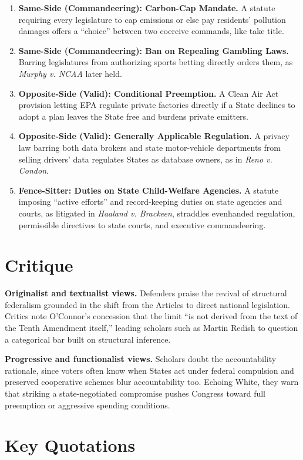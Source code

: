\documentclass[12pt]{article}
\begin{document}
\begin{enumerate}
\item \textbf{Same-Side (Commandeering): Carbon-Cap Mandate.} A statute requiring every legislature to cap emissions or else pay residents' pollution damages offers a ``choice'' between two coercive commands, like take title.
\item \textbf{Same-Side (Commandeering): Ban on Repealing Gambling Laws.} Barring legislatures from authorizing sports betting directly orders them, as \textit{Murphy v. NCAA} later held.
\item \textbf{Opposite-Side (Valid): Conditional Preemption.} A Clean Air Act provision letting EPA regulate private factories directly if a State declines to adopt a plan leaves the State free and burdens private emitters.
\item \textbf{Opposite-Side (Valid): Generally Applicable Regulation.} A privacy law barring both data brokers and state motor-vehicle departments from selling drivers' data regulates States as database owners, as in \textit{Reno v. Condon}.
\item \textbf{Fence-Sitter: Duties on State Child-Welfare Agencies.} A statute imposing ``active efforts'' and record-keeping duties on state agencies and courts, as litigated in \textit{Haaland v. Brackeen}, straddles evenhanded regulation, permissible directives to state courts, and executive commandeering.
\end{enumerate}

\section{Critique}

\textbf{Originalist and textualist views.} Defenders praise the revival of structural federalism grounded in the shift from the Articles to direct national legislation. Critics note O'Connor's concession that the limit ``is not derived from the text of the Tenth Amendment itself,'' leading scholars such as Martin Redish to question a categorical bar built on structural inference.

\textbf{Progressive and functionalist views.} Scholars doubt the accountability rationale, since voters often know when States act under federal compulsion and preserved cooperative schemes blur accountability too. Echoing White, they warn that striking a state-negotiated compromise pushes Congress toward full preemption or aggressive spending conditions.

\section{Key Quotations}
\end{document}
